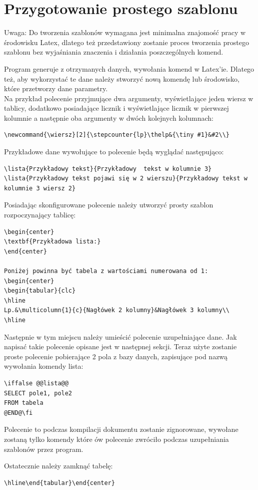 \section{Przygotowanie prostego szablonu}

Uwaga: Do tworzenia szablonów wymagana jest minimalna znajomość pracy w środowisku Latex, dlatego też przedstawiony zostanie proces tworzenia prostego szablonu bez wyjaśniania znaczenia i działania poszczególnych komend.
\vspace{5mm}
\par Program generuje z otrzymanych danych, wywołania komend w Latex'ie. Dlatego też, aby wykorzystać te dane należy stworzyć nową komendę lub środowisko, które przetworzy dane parametry.\\ Na przykład polecenie przyjmujące dwa argumenty, wyświetlające jeden wiersz w tablicy, dodatkowo posiadające licznik i wyświetlające licznik w pierwszej kolumnie a następnie oba argumenty w dwóch kolejnych kolumnach:
\begin{lstlisting}
\newcommand{\wiersz}[2]{\stepcounter{lp}\thelp&{\tiny #1}&#2\\}
\end{lstlisting}

Przykładowe dane wywołujące to polecenie będą wyglądać następująco:
\begin{lstlisting}
\lista{Przykładowy tekst}{Przykładowy  tekst w kolumnie 3}
\lista{Przykładowy tekst pojawi się w 2 wierszu}{Przykładowy tekst w kolumnie 3 wiersz 2}
\end{lstlisting}

Posiadając skonfigurowane polecenie należy utworzyć prosty szablon rozpoczynający tablicę:
\begin{lstlisting}
\begin{center}
\textbf{Przykładowa lista:} 
\end{center}

Poniżej powinna być tabela z wartościami numerowana od 1:
\begin{center}
\begin{tabular}{clc}
\hline
Lp.&\multicolumn{1}{c}{Nagłówek 2 kolumny}&Nagłówek 3 kolumny\\
\hline
\end{lstlisting}

Następnie w tym miejscu należy umieścić polecenie uzupełniające dane. Jak napisać takie polecenie opisane jest w następnej sekcji. Teraz użyte zostanie proste polecenie pobierające 2 pola z bazy danych, zapisujące pod nazwą wywołania komendy lista:
\begin{lstlisting}
\iffalse @@lista@@
SELECT pole1, pole2
FROM tabela
@END@\fi
\end{lstlisting}
Polecenie to podczas kompilacji dokumentu zostanie zignorowane, wywołane zostaną tylko komendy które ów polecenie zwróciło podczas uzupełniania szablonów przez program.
\par
Ostatecznie należy zamknąć tabelę:
\begin{lstlisting}
\hline\end{tabular}\end{center}
\end{lstlisting}

